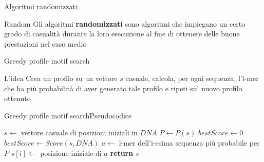 	\begin{frame}{Algoritmi randomizzati}
		\begin{block}{Random}
			Gli algoritmi \alert{\textbf{randomizzati}} sono algoritmi che impiegano un certo grado di casualità durante la loro esecuzione al fine di ottenere delle buone prestazioni nel caso medio
		\end{block}
	\end{frame}
	
	\begin{frame}{Greedy profile motif search}
		\begin{block}{L'idea}
			Crea un profilo su un vettore $s$ casuale, calcola, per ogni sequenza, l'l-mer che ha più probabilità di aver generato tale profilo e ripeti sul nuovo profilo ottenuto
		\end{block}
	\end{frame}
	
	\begin{frame}{Greedy profile motif search}{Pseudocodice}
		\begin{center}
			\begin{minipage}{10.5cm}
			    \begin{algorithmic}[1]
				    	\State $s\gets$  vettore casuale di posizioni iniziali in $DNA$
				    	\State $P\gets P(s)$
				    	\State $bestScore\gets 0$
				    		\State $bestScore\gets Score(s,DNA)$
				    			\State $a\gets $ l-mer dell'i-esima sequenza più probabile per $P$
				    			\State $s[i]\gets $ posizione iniziale di $a$
				    		\EndFor
				    	\EndWhile
				    	\State \textbf{return} $s$
				    \EndProcedure
			    \end{algorithmic}
			\end{minipage}
	    \end{center}
	\end{frame}
	
